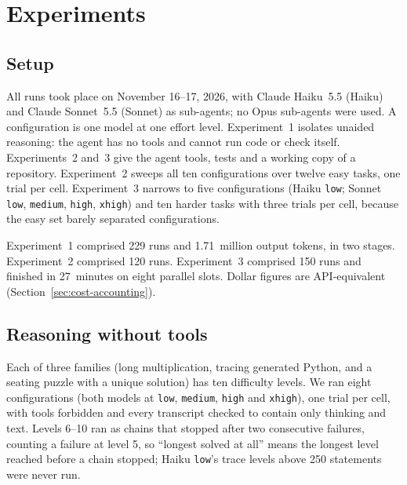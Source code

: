 \section{Experiments}\label{sec:experiments}

\subsection{Setup}\label{sec:exp-setup}

All runs took place on November 16--17, 2026, with Claude Haiku~5.5 (Haiku) and Claude Sonnet~5.5 (Sonnet) as sub-agents; no Opus sub-agents were used. A configuration is one model at one effort level. Experiment~1 isolates unaided reasoning: the agent has no tools and cannot run code or check itself. Experiments~2 and~3 give the agent tools, tests and a working copy of a repository. Experiment~2 sweeps all ten configurations over twelve easy tasks, one trial per cell. Experiment~3 narrows to five configurations (Haiku \texttt{low}; Sonnet \texttt{low}, \texttt{medium}, \texttt{high}, \texttt{xhigh}) and ten harder tasks with three trials per cell, because the easy set barely separated configurations.

Experiment~1 comprised 229 runs and 1.71~million output tokens, in two stages. Experiment~2 comprised 120 runs. Experiment~3 comprised 150 runs and finished in 27~minutes on eight parallel slots. Dollar figures are API-equivalent (Section~\ref{sec:cost-accounting}).

\subsection{Reasoning without tools}\label{sec:exp-reasoning}

Each of three families (long multiplication, tracing generated Python, and a seating puzzle with a unique solution) has ten difficulty levels. We ran eight configurations (both models at \texttt{low}, \texttt{medium}, \texttt{high} and \texttt{xhigh}), one trial per cell, with tools forbidden and every transcript checked to contain only thinking and text. Levels 6--10 ran as chains that stopped after two consecutive failures, counting a failure at level 5, so ``longest solved at all'' means the longest level reached before a chain stopped; Haiku \texttt{low}'s trace levels above 250 statements were never run.

